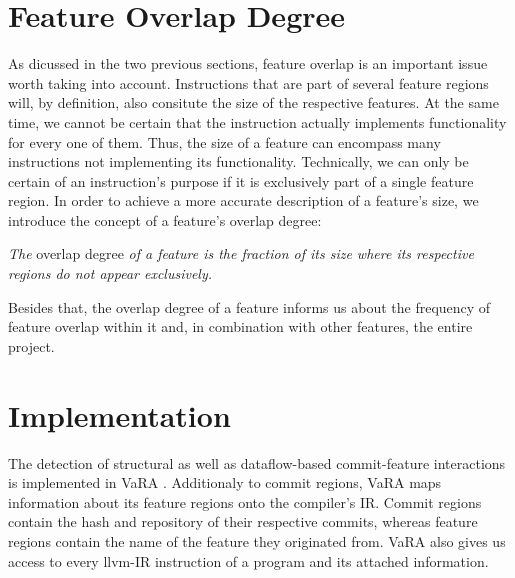 \section{Feature Overlap Degree}\label{sec:feature_overlap_degree}
As dicussed in the two previous sections, feature overlap is an important issue worth taking into account.
Instructions that are part of several feature regions will, by definition, also consitute the size of the respective features.
At the same time, we cannot be certain that the instruction actually implements functionality for every one of them.
Thus, the size of a feature can encompass many instructions not implementing its functionality.
Technically, we can only be certain of an instruction's purpose if it is exclusively part of a single feature region.
In order to achieve a more accurate description of a feature's size, we introduce the concept of a feature's overlap degree:
\begin{definition} \label{def:feature_overlap_degree}
\emph{The} overlap degree \emph{of a feature is the fraction of its size where its respective regions do not appear exclusively.}
\end{definition}
Besides that, the overlap degree of a feature informs us about the frequency of feature overlap within it and, in combination with other features, the entire project.

\section{Implementation}\label{ch:implementation}

The detection of structural as well as dataflow-based commit-feature interactions is implemented in VaRA \cite{VaRA2023}.
Additionaly to commit regions, VaRA maps information about its feature regions onto the compiler's IR.
Commit regions contain the hash and repository of their respective commits, whereas feature regions contain the name of the feature they originated from.
VaRA also gives us access to every llvm-IR instruction of a program and its attached information.

